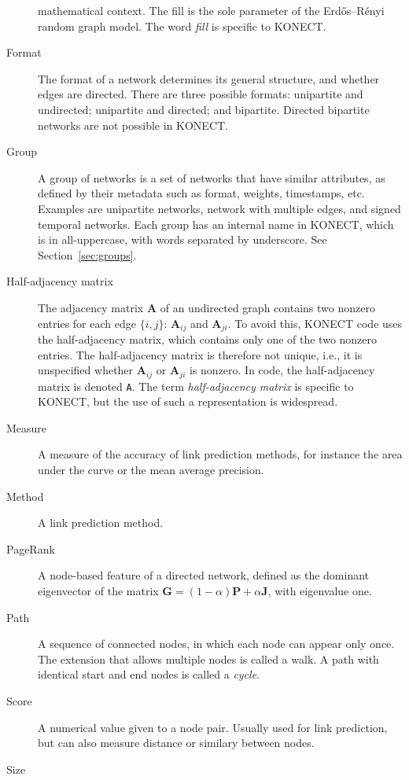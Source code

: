 \documentclass{article}
\begin{document}
\begin{description}
    mathematical context.  The fill is the sole parameter of the
    Erdős--Rényi random graph model.  The word \emph{fill} is specific
    to KONECT. 
  \item[Format] 
    The format of a network determines its general structure, and
    whether edges are directed.  There are three possible formats:
    unipartite and undirected; unipartite and directed; and bipartite.
    Directed bipartite networks are not possible in KONECT.  
  \item[Group]
    A group of networks is a set of networks that have similar
    attributes, as defined by their metadata such as format, weights,
    timestamps, etc.  Examples are unipartite networks, network with
    multiple edges, and signed temporal networks.  Each group has an
    internal name in KONECT, which is in all-uppercase, with words
    separated by underscore.  See Section~\ref{sec:groups}. 
  \item[Half-adjacency matrix]
    The adjacency matrix $\mathbf A$ of an undirected graph contains two
    nonzero entries for each edge $\{i,j\}$:  $\mathbf A_{ij}$ and
    $\mathbf A_{ji}$.  To avoid this, KONECT code uses the
    half-adjacency matrix, which contains only one of the two nonzero
    entries.  The half-adjacency matrix is therefore not unique, i.e.,
    it is unspecified whether $\mathbf A_{ij}$ or $\mathbf A_{ji}$ is nonzero.  In
    code, the half-adjacency matrix is denoted \texttt{A}.  The term
    \emph{half-adjacency matrix} is specific to KONECT, but the use of
    such a representation is widespread. 
  \item[Measure]
    A measure of the accuracy of link prediction methods, for instance
    the area under the curve or the mean average precision.  
  \item[Method]
    A link prediction method. 
  \item[PageRank] 
    A node-based feature of a directed network, defined as the dominant
    eigenvector of the matrix $\mathbf G = (1-\alpha) \mathbf P +
    \alpha\mathbf J$, with eigenvalue one. 
  \item[Path]
    A sequence of connected nodes, in which each node can appear only
    once.  The extension that allows multiple nodes is called a walk.  A
    path with identical start and end nodes is called a \emph{cycle}. 
  \item[Score]
    A numerical value given to a node pair.  Usually used for link
    prediction, but can also measure distance or similary between
    nodes. 
  \item[Size]

\end{description}
\end{document}
